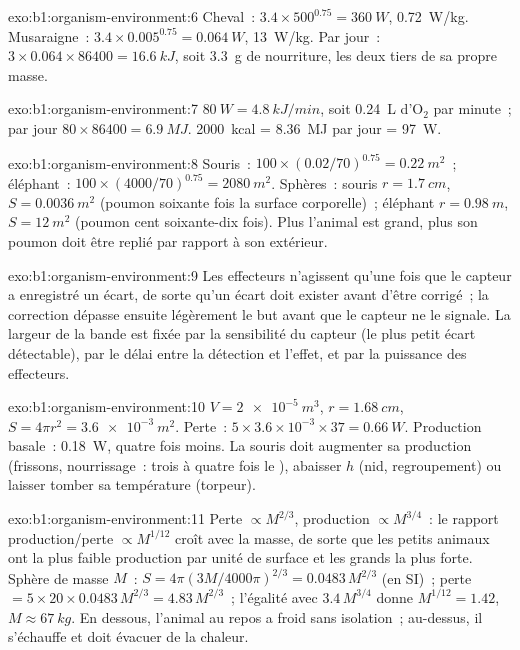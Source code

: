 \begin{solution}{exo:b1:organism-environment:6}
Cheval~: $3.4\times 500^{0.75} = \qty{360}{W}$, \qty{0.72}{W/kg}.
Musaraigne~: $3.4\times 0.005^{0.75} = \qty{0.064}{W}$, \qty{13}{W/kg}.
Par jour~: $3\times 0.064\times 86400 = \qty{16.6}{kJ}$, soit
\qty{3.3}{g} de nourriture, les deux tiers de sa propre masse.
\end{solution}

\begin{solution}{exo:b1:organism-environment:7}
$\qty{80}{W} = \qty{4.8}{kJ/min}$, soit \qty{0.24}{L} d'$\mathrm{O_2}$
par minute~; par jour $80\times 86400 = \qty{6.9}{MJ}$. \qty{2000}{kcal}
= \qty{8.36}{MJ} par jour = \qty{97}{W}.
\end{solution}

\begin{solution}{exo:b1:organism-environment:8}
Souris~: $100\times(0.02/70)^{0.75} = \qty{0.22}{m^2}$~; éléphant~:
$100\times(4000/70)^{0.75} = \qty{2080}{m^2}$. Sphères~: souris
$r = \qty{1.7}{cm}$, $S = \qty{0.0036}{m^2}$ (poumon soixante fois la
surface corporelle)~; éléphant $r = \qty{0.98}{m}$, $S = \qty{12}{m^2}$
(poumon cent soixante-dix fois). Plus l'animal est grand, plus son
poumon doit être replié par rapport à son extérieur.
\end{solution}

\begin{solution}{exo:b1:organism-environment:9}
Les effecteurs n'agissent qu'une fois que le capteur a enregistré un
écart, de sorte qu'un écart doit exister avant d'être corrigé~; la
correction dépasse ensuite légèrement le but avant que le capteur ne le
signale. La largeur de la bande est fixée par la sensibilité du capteur
(le plus petit écart détectable), par le délai entre la détection et
l'effet, et par la puissance des effecteurs.
\end{solution}

\begin{solution}{exo:b1:organism-environment:10}
$V = \qty{2e-5}{m^3}$, $r = \qty{1.68}{cm}$, $S = 4\pi r^2 =
\qty{3.6e-3}{m^2}$. Perte~: $5\times 3.6\times 10^{-3}\times 37 =
\qty{0.66}{W}$. Production basale~: \qty{0.18}{W}, quatre fois moins. La
souris doit augmenter sa production (frissons, nourrissage~: trois à
quatre fois le ), abaisser $h$ (nid, regroupement) ou
laisser tomber sa température (torpeur).
\end{solution}

\begin{solution}{exo:b1:organism-environment:11}
Perte $\propto M^{2/3}$, production $\propto M^{3/4}$~: le rapport
production/perte $\propto M^{1/12}$ croît avec la masse, de sorte que
les petits animaux ont la plus faible production par unité de surface et
les grands la plus forte. Sphère de masse $M$~:
$S = 4\pi(3M/4000\pi)^{2/3} = \num{0.0483}\,M^{2/3}$ (en SI)~;
perte $= 5\times 20\times 0.0483\,M^{2/3} = 4.83\,M^{2/3}$~; l'égalité
avec $3.4\,M^{3/4}$ donne $M^{1/12} = 1.42$, $M \approx \qty{67}{kg}$.
En dessous, l'animal au repos a froid sans isolation~; au-dessus, il
s'échauffe et doit évacuer de la chaleur.
\end{solution}

